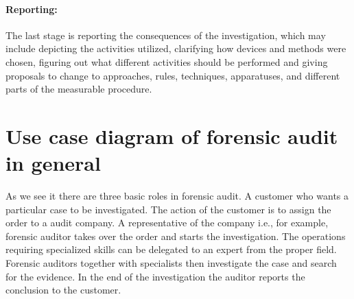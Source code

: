\paragraph{Reporting:}
The last stage is reporting the consequences of the investigation, which may include depicting the activities utilized, clarifying how devices and methods were chosen, figuring out what different activities should be performed and giving proposals to change to approaches, rules, techniques, apparatuses, and different parts of the measurable procedure. 







\section{Use case diagram of forensic audit in general}

As we see it there are three basic roles in forensic audit. A customer who wants a particular case to be investigated. The action of the customer is to assign the order to a audit company. A representative of the company i.e., for example, forensic auditor takes over the order and starts the investigation. The operations requiring specialized skills can be delegated to an expert from the proper field. Forensic auditors together with specialists then investigate the case and search for the evidence. In the end of the investigation the auditor reports the conclusion to the customer. 

